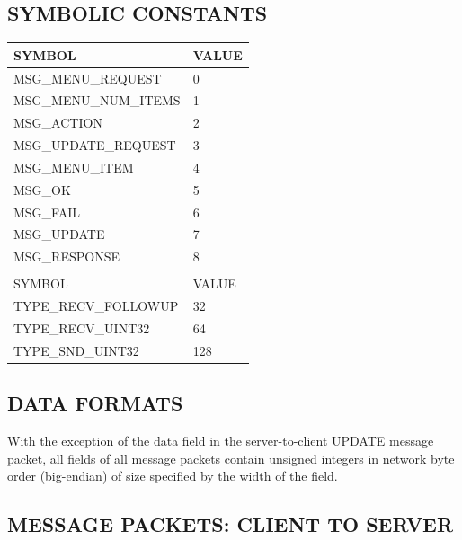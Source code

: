 \documentclass[a4paper,11pt]{article}
\begin{document}
\subsection{SYMBOLIC CONSTANTS}
\label{constants}
\hfill\begin{minipage}{\dimexpr\textwidth-1.13cm}
\begin{tabular}{l l}
SYMBOL & VALUE\\
\hline
MSG\_MENU\_REQUEST & 0\\
MSG\_MENU\_NUM\_ITEMS & 1\\
MSG\_ACTION & 2\\
MSG\_UPDATE\_REQUEST & 3\\
MSG\_MENU\_ITEM & 4\\
MSG\_OK & 5\\
MSG\_FAIL & 6\\
MSG\_UPDATE & 7\\
MSG\_RESPONSE & 8\\
 & \\
SYMBOL & VALUE\\
\hline
TYPE\_RECV\_FOLLOWUP & 32 \\
TYPE\_RECV\_UINT32 & 64 \\
TYPE\_SND\_UINT32 & 128 \\
\end{tabular}

\end{minipage}
\subsection{DATA FORMATS}
\hfill\begin{minipage}{\dimexpr\textwidth-1.2cm}
With the exception of the data field in the server-to-client
UPDATE message packet, all fields of all message packets contain
unsigned integers in network byte order (big-endian) of size
specified by the width of the field.
\end{minipage}

\subsection{MESSAGE PACKETS: CLIENT TO SERVER}
\end{document}
